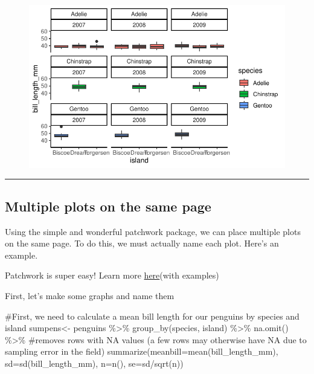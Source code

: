 \documentclass[
  letterpaper,
  DIV=11,
  numbers=noendperiod]{scrartcl}
\newenvironment{Shaded}{\begin{snugshade}}{\end{snugshade}}
\newcommand{\AttributeTok}[1]{\textcolor[rgb]{0.40,0.45,0.13}{#1}}
\newcommand{\CommentTok}[1]{\textcolor[rgb]{0.37,0.37,0.37}{#1}}
\newcommand{\FunctionTok}[1]{\textcolor[rgb]{0.28,0.35,0.67}{#1}}
\newcommand{\NormalTok}[1]{\textcolor[rgb]{0.00,0.23,0.31}{#1}}
\newcommand{\OtherTok}[1]{\textcolor[rgb]{0.00,0.23,0.31}{#1}}
\newcommand{\SpecialCharTok}[1]{\textcolor[rgb]{0.37,0.37,0.37}{#1}}
\begin{document}
\begin{figure}[H]

{\centering \includegraphics{facets_files/figure-pdf/unnamed-chunk-5-1.pdf}

}

\end{figure}

\begin{center}\rule{0.5\linewidth}{0.5pt}\end{center}

\hypertarget{multiple-plots-on-the-same-page}{%
\subsection{\texorpdfstring{\textbf{Multiple plots on the same
page}}{Multiple plots on the same page}}\label{multiple-plots-on-the-same-page}}

Using the simple and wonderful patchwork package, we can place multiple
plots on the same page. To do this, we must actually name each plot.
Here's an example.

Patchwork is super easy! Learn more
\href{https://patchwork.data-imaginist.com/articles/patchwork.html}{here}(with
examples)

First, let's make some graphs and name them

\begin{Shaded}
\begin{Highlighting}[]
\CommentTok{\#First, we need to calculate a mean bill length for our penguins by species and island}
\NormalTok{sumpens}\OtherTok{\textless{}{-}}\NormalTok{ penguins }\SpecialCharTok{\%\textgreater{}\%}
  \FunctionTok{group\_by}\NormalTok{(species, island) }\SpecialCharTok{\%\textgreater{}\%}
  \FunctionTok{na.omit}\NormalTok{() }\SpecialCharTok{\%\textgreater{}\%} \CommentTok{\#removes rows with NA values (a few rows may otherwise have NA due to sampling error in the field)}
  \FunctionTok{summarize}\NormalTok{(}\AttributeTok{meanbill=}\FunctionTok{mean}\NormalTok{(bill\_length\_mm), }\AttributeTok{sd=}\FunctionTok{sd}\NormalTok{(bill\_length\_mm), }\AttributeTok{n=}\FunctionTok{n}\NormalTok{(), }\AttributeTok{se=}\NormalTok{sd}\SpecialCharTok{/}\FunctionTok{sqrt}\NormalTok{(n))}
\end{Highlighting}
\end{Shaded}
\end{document}
